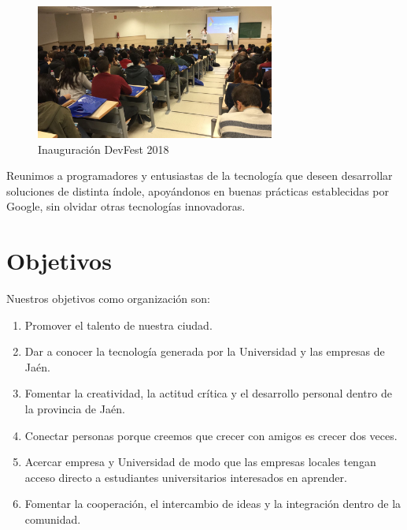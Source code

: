 \documentclass[12pt]{article}
\begin{document}
\begin{figure}[h]
    \centering
    \includegraphics[width=0.7\textwidth]{people.jpeg}
    \caption{Inauguración DevFest 2018}
    \label{fig:my_label}
\end{figure}

Reunimos a programadores y entusiastas de la tecnología que deseen desarrollar soluciones de distinta índole, apoyándonos en buenas prácticas establecidas por Google, sin olvidar otras tecnologías innovadoras.


\section{Objetivos}
Nuestros objetivos como organización son:
\begin{enumerate}
    \item Promover el talento de nuestra ciudad.
    \item Dar a conocer la tecnología generada por la Universidad y las empresas de Jaén.
    \item Fomentar la creatividad, la actitud crítica y el desarrollo personal dentro de la provincia de Jaén.
    \item Conectar personas porque creemos que crecer con amigos es crecer dos veces.
    \item Acercar empresa y Universidad de modo que las empresas locales tengan acceso directo a estudiantes universitarios interesados en aprender.
    \item Fomentar la cooperación, el intercambio de ideas y la integración dentro de la comunidad.
\end{enumerate}
\end{document}
